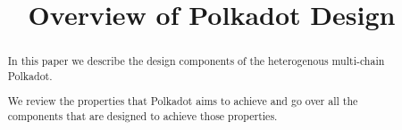 \documentclass{article}
\title{Overview of Polkadot Design}
\author{}
\begin{document}
\maketitle

\begin{abstract}
In this paper we describe the design components of the heterogenous multi-chain Polkadot.

We review the properties that Polkadot aims to achieve and go over all the components that are designed to achieve those properties.

\end{abstract}

\newpage
\tableofcontents
\newpage



 



%
\end{document}
